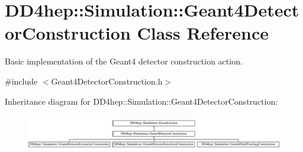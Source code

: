 \hypertarget{class_d_d4hep_1_1_simulation_1_1_geant4_detector_construction}{}\section{D\+D4hep\+:\+:Simulation\+:\+:Geant4\+Detector\+Construction Class Reference}
\label{class_d_d4hep_1_1_simulation_1_1_geant4_detector_construction}


Basic implementation of the Geant4 detector construction action.  




{\ttfamily \#include $<$Geant4\+Detector\+Construction.\+h$>$}

Inheritance diagram for D\+D4hep\+:\+:Simulation\+:\+:Geant4\+Detector\+Construction\+:\begin{figure}[H]
\begin{center}
\leavevmode
\includegraphics[height=1.595442cm]{class_d_d4hep_1_1_simulation_1_1_geant4_detector_construction}
\end{center}
\end{figure}
